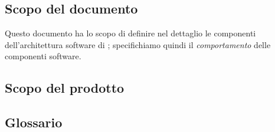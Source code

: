 


\subsection{Scopo del documento}
Questo documento ha lo scopo di definire nel dettaglio le componenti dell'architettura software di \proj; specifichiamo quindi il \emph{comportamento} delle componenti software.

\subsection{Scopo del prodotto}
\scopo

\subsection{Glossario}
\presgloss
